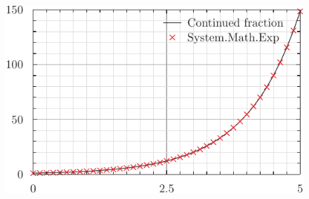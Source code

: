 \documentclass[12pt]{article}
\begin{document}
\begin{figure}[H] \label{fig:ex}
	\includegraphics[width=\linewidth]{explot.pdf}
\end{figure}
\end{document}
